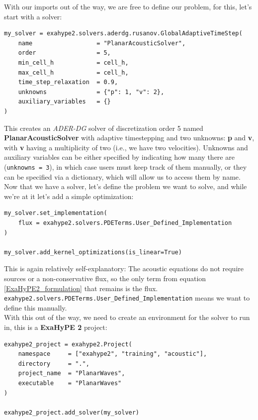 \documentclass[12pt,letterpaper]{article}
\begin{document}
With our imports out of the way, we are free to define our problem, for this, let's start with a solver:\\

\begin{lstlisting}[style = Python]
my_solver = exahype2.solvers.aderdg.rusanov.GlobalAdaptiveTimeStep(
    name                  = "PlanarAcousticSolver",
    order                 = 5,
    min_cell_h            = cell_h,
    max_cell_h            = cell_h,
    time_step_relaxation  = 0.9,
    unknowns              = {"p": 1, "v": 2},
    auxiliary_variables   = {}
)
\end{lstlisting}

This creates an \textit{ADER-DG} solver of discretization order 5 named \textbf{PlanarAcousticSolver} with adaptive timestepping and two unknowns:
\textbf{p} and \textbf{v}, with \textbf{v} having a multiplicity of two (i.e., we have two velocities).
Unknowns and auxiliary variables can be either specified by indicating how many there are (\texttt{unknowns = 3}),
in which case users must keep track of them manually, or they can be specified via a dictionary, which will allow us to access them by name.\\

Now that we have a solver, let's define the problem we want to solve, and while we're at it let's add a simple optimization:\\

\begin{lstlisting}[style = Python]
my_solver.set_implementation(
    flux = exahype2.solvers.PDETerms.User_Defined_Implementation
)

my_solver.add_kernel_optimizations(is_linear=True)
\end{lstlisting}

This is again relatively self-explanatory: The acoustic equations do not require sources or a non-conservative flux,
so the only term from equation \ref{ExaHyPE2_formulation} that remains is the flux.
\texttt{exahype2.solvers.PDETerms.User\_Defined\_Implementation} means we want to define this manually.\\
With this out of the way, we need to create an environment for the solver to run in, this is a \textbf{ExaHyPE 2} project:\\

\begin{lstlisting}[style = Python]
exahype2_project = exahype2.Project(
    namespace     = ["exahype2", "training", "acoustic"],
    directory     = ".",
    project_name  = "PlanarWaves",
    executable    = "PlanarWaves"
)

exahype2_project.add_solver(my_solver)
\end{lstlisting}
\end{document}
